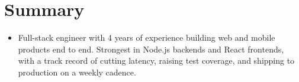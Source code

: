 \section{Summary}
\begin{itemize}[leftmargin=0.15in, label={}]
    \item \small{Full-stack engineer with 4 years of experience building web and mobile products end to end. Strongest in Node.js backends and React frontends, with a track record of cutting latency, raising test coverage, and shipping to production on a weekly cadence.}
\end{itemize}
